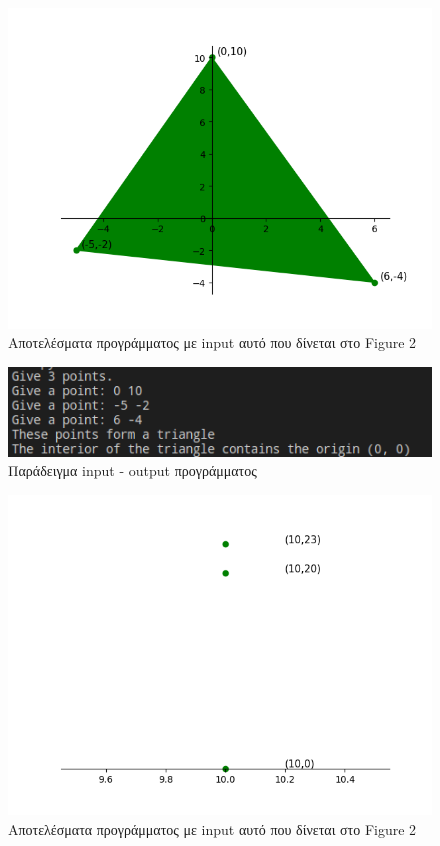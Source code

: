\documentclass[12pt]{article}
\newenvironment{matlab}
	{\begin{figure}[H]\centering\captionsetup{justification=centering}}
	{\end{figure}}
\begin{document}
\begin{matlab}
	\includegraphics[scale=0.8]{images/exercise1_1.png}
	\caption{Αποτελέσματα προγράμματος με input αυτό που δίνεται στο Figure 2}
\end{matlab}

\begin{matlab}
	\includegraphics[scale=0.7]{images/exercise1_2.png}
	\caption{Παράδειγμα input - output προγράμματος}
\end{matlab}

\begin{matlab}
	\includegraphics[scale=0.8]{images/exercise1_3.png}
	\caption{Αποτελέσματα προγράμματος με input αυτό που δίνεται στο Figure 2}
\end{matlab}
\end{document}

